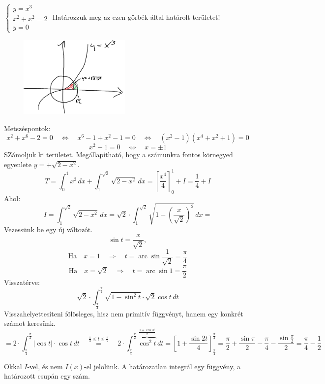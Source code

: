 \documentclass[a4paper,11.5pt]{article}
\DeclareMathOperator{\arc}{arc}
\begin{document}
	\begin{example}
		$\begin{cases}
			y=x^3\\
			x^2+x^2=2\\
			y=0
		\end{cases}$ Határozzuk meg az ezen görbék által határolt területet!
		\begin{figure}[H]
			\centering
			\includegraphics[height=4cm]{kepek/09.png}
			\caption{}
		\end{figure}
		
		Metszéspontok:
		\[ x^2+x^6-2=0\quad \Leftrightarrow\quad x^6-1+x^2-1=0\quad \Leftrightarrow\quad (x^2-1)(x^4+x^2+1)=0 \]
		\[ x^2-1=0\quad \Leftrightarrow\quad x=\pm1 \]
		SZámoljuk ki  területet. Megállapítható, hogy a számunkra fontos körnegyed egyenlete $y=+\sqrt{2-x^2}$.
		\[ T=\int_0^1x^3\,dx+\int_1^{\sqrt{2}}\sqrt{2-x^2}\,dx=\left[\frac{x^4}{4}\right]_0^1+I=\frac{1}{4}+I \]
		Ahol:
		\[ I=\int_1^{\sqrt{2}}\sqrt{2-x^2}\,dx=\sqrt{2}\cdot\int_1^{\sqrt{2}}\sqrt{1-\left(\frac{x}{\sqrt{2}}\right)^2}\,dx= \]
		Vezessünk be egy új változót.
		\[ \sin t=\frac{x}{\sqrt{2}},\]
		\[\text{Ha}\quad x=1\quad \Rightarrow\quad t=\arc\sin\frac{1}{\sqrt{2}}=\frac{\pi}{4} \]
		\[\text{Ha}\quad x=\sqrt{2}\quad \Rightarrow\quad t=\arc\sin1=\frac{\pi}{2} \]
		Visszatérve:
		\[ \sqrt{2}\cdot\int_{\frac{\pi}{4}}^{\frac{\pi}{2}}\sqrt{1-\sin^2t}\cdot\sqrt{2}\cos t\,dt \]
		Visszahelyettesíteni fölösleges, hisz nem primitív függvényt, hanem egy konkrét számot keresünk.
		\[ =2\cdot\int_{\frac{\pi}{4}}^{\frac{\pi}{2}}|\cos t|\cdot\cos t\,dt\quad \overset{\frac{\pi}{4}\leq t\leq \frac{\pi}{2}}{=}\quad2\cdot\int_{\frac{\pi}{4}}^{\frac{\pi}{2}}\overbrace{\cos^2t}^{\frac{1+\cos2t}{2}}\,dt=\left[1+\frac{\sin2t}{4}\right]_{\frac{\pi}{4}}^{\frac{\pi}{2}}=\frac{\pi}{2}+\frac{\sin\pi}{2}-\frac{\pi}{4}-\frac{\sin\frac{\pi}{2}}{2}=\frac{\pi}{4}-\frac{1}{2}  \]
	\end{example}
	\begin{note}
		Okkal $I$-vel, és nem $I(x)$-el jelölünk. A határozatlan integrál egy függvény, a határozott csupán egy szám.
	\end{note}
\end{document}

